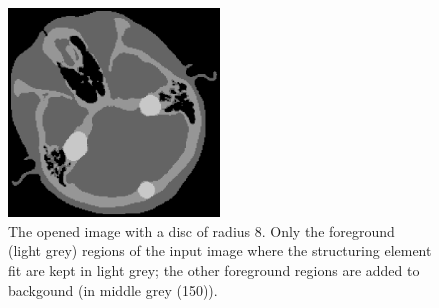 \documentclass[IJ]{cesj}
\begin{document}
\begin{figure}
\centering
\includegraphics[width=0.5\textwidth]{open.eps}
\caption{The opened image with a disc of radius 8. Only the foreground (light grey) regions of the input image where the structuring element fit are kept in light grey; the other foreground regions are added to backgound (in middle grey (150)).}
\end{figure}
\end{document}
